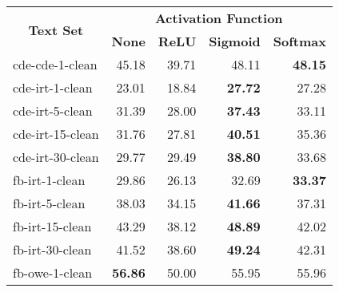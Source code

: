 \begin{tabular}{| l | r | r | r | r |}
    \hline

    \multicolumn{1}{|c|}{\multirow{2}{*}{\textbf{Text Set}}} &
    \multicolumn{4}{|c|}{\textbf{Activation Function}} \\

    &
    \multicolumn{1}{|c|}{\textbf{None}} &
    \multicolumn{1}{|c|}{\textbf{ReLU}} &
    \multicolumn{1}{|c|}{\textbf{Sigmoid}} &
    \multicolumn{1}{|c|}{\textbf{Softmax}} \\

    \hline \hline

    cde-cde-1-clean  & 45.18 & 39.71 & 48.11 & \textbf{48.15} \\
    cde-irt-1-clean  & 23.01 & 18.84 & \textbf{27.72} & 27.28 \\
    cde-irt-5-clean  & 31.39 & 28.00 & \textbf{37.43} & 33.11 \\
    cde-irt-15-clean & 31.76 & 27.81 & \textbf{40.51} & 35.36 \\
    cde-irt-30-clean & 29.77 & 29.49 & \textbf{38.80} & 33.68 \\ \hline
    fb-irt-1-clean   & 29.86 & 26.13 & 32.69 & \textbf{33.37} \\
    fb-irt-5-clean   & 38.03 & 34.15 & \textbf{41.66} & 37.31 \\
    fb-irt-15-clean  & 43.29 & 38.12 & \textbf{48.89} & 42.02 \\
    fb-irt-30-clean  & 41.52 & 38.60 & \textbf{49.24} & 42.31 \\
    fb-owe-1-clean   & \textbf{56.86} & 50.00 & 55.95 & 55.96 \\ \hline

\end{tabular}
